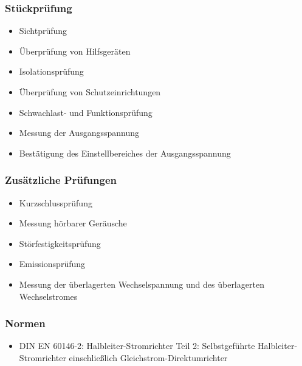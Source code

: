 \subsubsection*{Stückprüfung}
\begin{itemize}[noitemsep]
    \item Sichtprüfung
    \item Überprüfung von Hilfsgeräten
    \item Isolationsprüfung 
    \item Überprüfung von Schutzeinrichtungen
    \item Schwachlast- und Funktionsprüfung
    \item Messung der Ausgangsspannung
    \item Bestätigung des Einstellbereiches der Ausgangsspannung
\end{itemize}

\subsubsection*{Zusätzliche Prüfungen}
\begin{itemize}[noitemsep]
    \item Kurzschlussprüfung
    \item Messung hörbarer Geräusche
    \item Störfestigkeitsprüfung 
    \item Emissionsprüfung
    \item Messung der überlagerten Wechselspannung und des überlagerten Wechselstromes
\end{itemize}


\subsubsection*{Normen}
\begin{itemize}
    \item DIN EN 60146-2: Halbleiter-Stromrichter Teil 2: Selbstgeführte Halbleiter-Stromrichter
    einschließlich Gleichstrom-Direktumrichter
\end{itemize}
                                                           